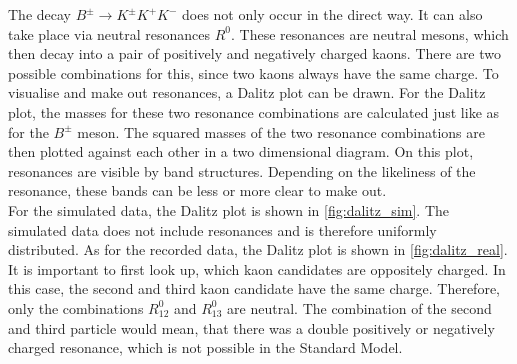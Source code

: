 The decay $B^{\pm} \rightarrow K^{\pm} K^+ K^-$ does not only occur in the direct way. It can also take place via neutral resonances $R^0$. These resonances are neutral mesons, which then decay into a pair of positively and negatively
charged kaons. There are two possible combinations for this, since two kaons always have the same charge. To visualise and make out resonances, a Dalitz plot can be drawn. For the Dalitz plot, the masses for these two resonance combinations
are calculated just like as for the $B^{\pm}$ meson. The squared masses of the two resonance combinations are then plotted against each other in a two dimensional diagram. On this plot, resonances are visible by band structures. Depending
on the likeliness of the resonance, these bands can be less or more clear to make out.\\
For the simulated data, the Dalitz plot is shown in \autoref{fig:dalitz_sim}. The simulated data does not include resonances and is therefore uniformly distributed.
As for the recorded data, the Dalitz plot is shown in \autoref{fig:dalitz_real}. It is important to first look up, which kaon candidates are oppositely charged. In this case, the second and third kaon candidate have the same charge. 
Therefore, only the combinations $R_{12}^0$ and $R_{13}^0$ are neutral. The combination of the second and third particle would mean, that there was a double positively or negatively charged resonance, which is not possible in the Standard Model.
